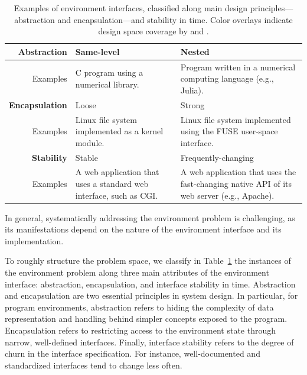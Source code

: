 \begin{table}
  \centering
  \small
  \begin{tabular}{r p{5cm} p{5cm}}
    
    \textbf{Abstraction} & \cnineccolor Same-level & \chefccolor Nested \\
    \hline
    \bigskip Examples      & C program using a numerical library.    & Program written in a numerical computing language (e.g., Julia). \\
    
    \textbf{Encapsulation} & \chefccolor Loose & \cnineccolor Strong \\
    \hline
    \bigskip Examples      & Linux file system implemented as a kernel module.   & Linux file system implemented using the FUSE user-space interface. \\
    
    \textbf{Stability}   & \cnineccolor Stable    & \chefccolor Frequently-changing \\
    \hline
        Examples          & A web application that uses a standard web interface, such as CGI.    & A web application that uses the fast-changing native API of its web server (e.g., Apache). \\
  \end{tabular}
  \caption{Examples of environment interfaces, classified along main design principles---abstraction and encapsulation---and stability in time.  Color overlays indicate design space coverage by \colorbox{GreenYellow}{\cnine} and \colorbox{SkyBlue}{\chef}.}
  \label{tab:intro:env}
\end{table}

In general, systematically addressing the environment problem is challenging, as its manifestations depend on the nature of the environment interface and its implementation.

To roughly structure the problem space, we classify in Table~\ref{tab:intro:env} the instances of the environment problem along three main attributes of the environment interface: abstraction, encapsulation, and interface stability in time.
%
Abstraction and encapsulation are two essential principles in system design.  In particular, for program environments, abstraction refers to hiding the complexity of data representation and handling behind simpler concepts exposed to the program.  Encapsulation refers to restricting access to the environment state through narrow, well-defined interfaces.
%
Finally, interface stability refers to the degree of churn in the interface specification.  For instance, well-documented and standardized interfaces tend to change less often.

